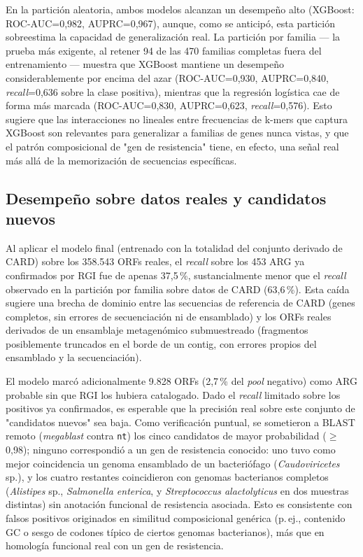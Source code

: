 \documentclass[journal]{vgtc}                     %
\begin{document}
En la partición aleatoria, ambos modelos alcanzan un desempeño alto (XGBoost: ROC-AUC=0,982, AUPRC=0,967), aunque, como se anticipó, esta partición sobreestima la capacidad de generalización real. La partición por familia --- la prueba más exigente, al retener 94 de las 470 familias completas fuera del entrenamiento --- muestra que XGBoost mantiene un desempeño considerablemente por encima del azar (ROC-AUC=0,930, AUPRC=0,840, \emph{recall}=0,636 sobre la clase positiva), mientras que la regresión logística cae de forma más marcada (ROC-AUC=0,830, AUPRC=0,623, \emph{recall}=0,576). Esto sugiere que las interacciones no lineales entre frecuencias de k-mers que captura XGBoost son relevantes para generalizar a familias de genes nunca vistas, y que el patrón composicional de "gen de resistencia" tiene, en efecto, una señal real más allá de la memorización de secuencias específicas.

\subsection{Desempeño sobre datos reales y candidatos nuevos}

Al aplicar el modelo final (entrenado con la totalidad del conjunto derivado de CARD) sobre los 358.543 ORFs reales, el \emph{recall} sobre los 453 ARG ya confirmados por RGI fue de apenas 37,5\,\%, sustancialmente menor que el \emph{recall} observado en la partición por familia sobre datos de CARD (63,6\,\%). Esta caída sugiere una brecha de dominio entre las secuencias de referencia de CARD (genes completos, sin errores de secuenciación ni de ensamblado) y los ORFs reales derivados de un ensamblaje metagenómico submuestreado (fragmentos posiblemente truncados en el borde de un contig, con errores propios del ensamblado y la secuenciación).

El modelo marcó adicionalmente 9.828 ORFs (2,7\,\% del \emph{pool} negativo) como ARG probable sin que RGI los hubiera catalogado. Dado el \emph{recall} limitado sobre los positivos ya confirmados, es esperable que la precisión real sobre este conjunto de "candidatos nuevos" sea baja. Como verificación puntual, se sometieron a BLAST remoto (\emph{megablast} contra \texttt{nt}) los cinco candidatos de mayor probabilidad ($\geq$0,98); ninguno correspondió a un gen de resistencia conocido: uno tuvo como mejor coincidencia un genoma ensamblado de un bacteriófago (\textit{Caudoviricetes} sp.), y los cuatro restantes coincidieron con genomas bacterianos completos (\textit{Alistipes} sp., \textit{Salmonella enterica}, y \textit{Streptococcus alactolyticus} en dos muestras distintas) sin anotación funcional de resistencia asociada. Esto es consistente con falsos positivos originados en similitud composicional genérica (p.\,ej., contenido GC o sesgo de codones típico de ciertos genomas bacterianos), más que en homología funcional real con un gen de resistencia.
\end{document}
